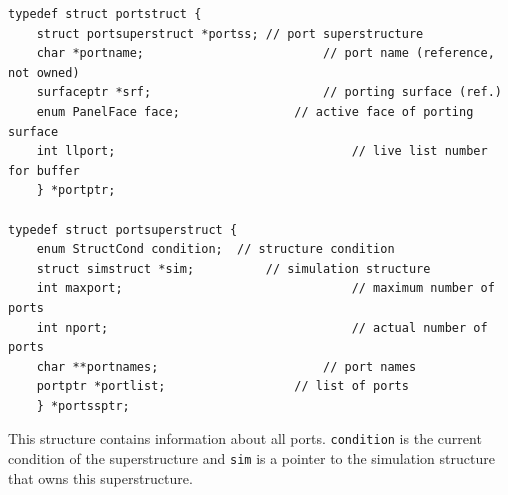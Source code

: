 \documentclass {scrbook}
\newcommand {\ttt} {\texttt}
\begin{document}
\begin{lstlisting}
typedef struct portstruct {
	struct portsuperstruct *portss;	// port superstructure
	char *portname;							// port name (reference, not owned)
	surfaceptr *srf;						// porting surface (ref.)
	enum PanelFace face;				// active face of porting surface
	int llport;									// live list number for buffer
	} *portptr;

typedef struct portsuperstruct {
	enum StructCond condition;	// structure condition
	struct simstruct *sim;			// simulation structure
	int maxport;								// maximum number of ports
	int nport;									// actual number of ports
	char **portnames;						// port names
	portptr *portlist;					// list of ports
	} *portssptr;
\end{lstlisting}

This structure contains information about all ports. \ttt{condition} is the current condition of the superstructure and \ttt{sim} is a pointer to the simulation structure that owns this superstructure.
\end{document}
